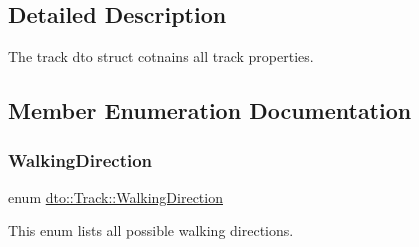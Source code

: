 \subsection{Detailed Description}
The track dto struct cotnains all track properties. 

\subsection{Member Enumeration Documentation}
\mbox{\label{structdto_1_1_track_a2d90d1ffc1df80623114c42f874aad04}} 
\subsubsection{\texorpdfstring{Walking\+Direction}{WalkingDirection}}
{\footnotesize\ttfamily enum \mbox{\hyperlink{structdto_1_1_track_a2d90d1ffc1df80623114c42f874aad04}{dto\+::\+Track\+::\+Walking\+Direction}}}



This enum lists all possible walking directions. 

